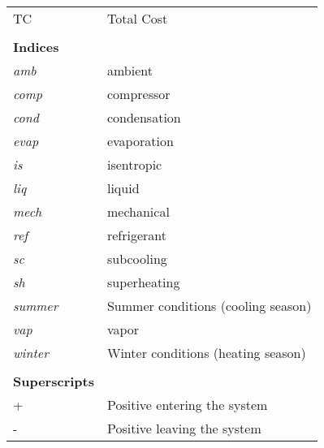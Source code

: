 \begin{table}[thp!]
\begin{tabular}{ll}
		TC & Total Cost \\
		&  \\
		\textbf{Indices} &  \\
		\textit{amb} & ambient \\
		\textit{comp} & compressor \\
		\textit{cond} & condensation \\
		\textit{evap} & evaporation \\
		\textit{is} & isentropic \\
		\textit{liq} & liquid \\
		\textit{mech} & mechanical \\
		\textit{ref} & refrigerant \\
		\textit{sc} & subcooling \\
		\textit{sh} & superheating \\
		\textit{summer} & Summer conditions (cooling season) \\
		\textit{vap} & vapor \\
		\textit{winter} & Winter conditions (heating season) \\
		&  \\
		\textbf{Superscripts} &  \\
		+ & Positive entering the system \\
		- & Positive leaving the system
	\end{tabular}
\end{table}
